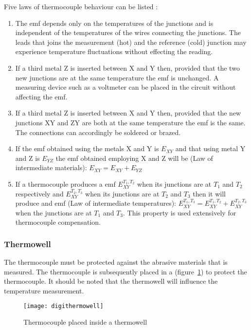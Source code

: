Five laws of thermocouple behaviour can be listed \citep[469]{Richardson94}:
\begin{enumerate}
	\item The emf depends only on the temperatures of the junctions and is independent of the temperatures of the 		wires connecting the junctions. The leads that joins the measurement (hot) and the reference (cold) 						junction may experience temperature fluctuations without effecting the reading.
	\item If a third metal Z is inserted between X and Y then, provided that the two new junctions are at the 				same temperature the emf is unchanged. A measuring device such as a voltmeter can be placed in the 							circuit without affecting the emf. 
	\item If a third metal Z is inserted between X and Y then, provided that the new junctions XY and ZY are both 		at the same temperature the emf is the same. The connections can accordingly be soldered or brazed.   
	\item If the emf obtained using the metals X and Y is $E_{XY}$ and that using metal Y and Z is $E_{YZ}$ the 			emf obtained employing X and Z will be (Law of intermediate materials):
				\(E_{XY} = E_{XY} + E_{YZ} \)
	\item If a thermocouple produces a emf $E_{XY}^{T_1 , T_2}$ when its junctions are at $T_1$ and $T_2$ 						respectively and $E_{XY}^{T_2, T_3}$ when its junctions are at $T_2$ and $T_3$ then it will produce and emf 		(Law of intermediate temperatures):
				\(E_{XY}^{T_1 , T_3} = E_{XY}^{T_1 , T_2} + E_{XY}^{T_2 , T_3}\)
		when the junctions are at $T_1$ and $T_3$. This property is used extensively for thermocouple compensation.
\end{enumerate}

\subsubsection{Thermowell}
The thermocouple must be protected against the abrasive materials that is measured. The thermocouple is subsequently placed in a  (figure~\ref{fig:digi:thermowell}) to protect the thermocouple. It should be noted that the thermowell will influence the temperature measurement. 
\begin{figure}[htbp]
	\centering
	\texttt{[image: digithermowell]}
	\caption{Thermocouple placed inside a thermowell}
	\label{fig:digi:thermowell}
\end{figure}

